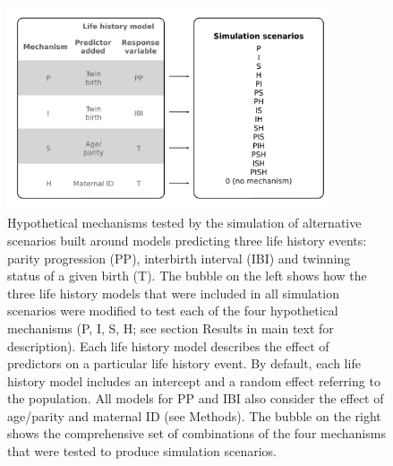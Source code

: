 \documentclass[a4paper]{article}\usepackage[]{graphicx}\usepackage[]{color}
\begin{document}
\begin{figure}[H]
\begin{center}
\includegraphics[height = 6cm]{../figures/figS3.pdf}
\end{center}
\caption{Hypothetical mechanisms tested by the simulation of alternative scenarios built around models predicting three life history events: parity progression (PP), interbirth interval (IBI) and twinning status of a given birth (T). The bubble on the left shows how the three life history models that were included in all simulation scenarios were modified to test each of the four hypothetical mechanisms (P, I, S, H; see section Results in main text for description). Each life history model describes the effect of predictors on a particular life history event. By default, each life history model includes an intercept and a random effect referring to the population. All models for PP and IBI also consider the effect of age/parity and maternal ID (see Methods). The bubble on the right shows the comprehensive set of combinations of the four mechanisms that were tested to produce simulation scenarios.}
\end{figure}
\end{document}
